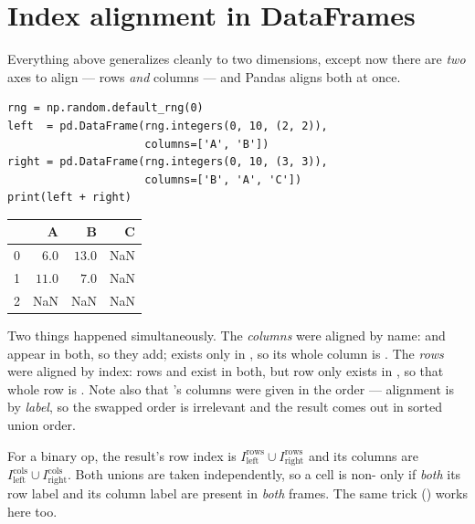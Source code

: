 \documentclass[11pt]{article}
\begin{document}
\section{Index alignment in DataFrames}

Everything above generalizes cleanly to two dimensions, except now there are \emph{two} axes to align --- rows \emph{and} columns --- and Pandas aligns both at once.

\begin{lstlisting}
rng = np.random.default_rng(0)
left  = pd.DataFrame(rng.integers(0, 10, (2, 2)),
                     columns=['A', 'B'])
right = pd.DataFrame(rng.integers(0, 10, (3, 3)),
                     columns=['B', 'A', 'C'])
print(left + right)
\end{lstlisting}

\begin{outbox}
\begin{tabular}{l r r r}
\toprule
 & \textbf{A} & \textbf{B} & \textbf{C} \\
\midrule
0 & $6.0$ & $13.0$ & NaN \\
1 & $11.0$ & $7.0$ & NaN \\
2 & NaN & NaN & NaN \\
\bottomrule
\end{tabular}
\end{outbox}

Two things happened simultaneously. The \emph{columns} were aligned by name:  and  appear in both, so they add;  exists only in , so its whole column is . The \emph{rows} were aligned by index: rows  and  exist in both, but row  only exists in , so that whole row is . Note also that 's columns were given in the order  --- alignment is by \emph{label}, so the swapped order is irrelevant and the result comes out in sorted union order.

\begin{keyidea}
For a  binary op, the result's row index is $I^{\text{rows}}_{\text{left}} \cup I^{\text{rows}}_{\text{right}}$ and its columns are $I^{\text{cols}}_{\text{left}} \cup I^{\text{cols}}_{\text{right}}$. Both unions are taken independently, so a cell is non- only if \emph{both} its row label and its column label are present in \emph{both} frames. The same  trick () works here too.
\end{keyidea}
\end{document}
